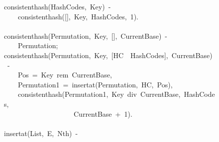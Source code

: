 \documentclass[runningheads,a4paper]{llncs}
\newcommand{\hlstd}[1]{\textcolor[rgb]{0,0,0}{#1}}
\newcommand{\hlnum}[1]{\textcolor[rgb]{0.69,0.49,0}{#1}}
\newcommand{\hlopt}[1]{\textcolor[rgb]{0,0,0}{#1}}
\newcommand{\hlkwd}[1]{\textcolor[rgb]{0,0,0.51}{#1}}
\begin{document}
\begin{figure}
\noindent
\ttfamily
\hlkwd{consistent\textunderscore hash}\hlstd{}\hlopt{(}\hlstd{HashCodes}\hlopt{,\ }\hlstd{Key}\hlopt{)\ {-}}\hspace*{\fill}\\
\hlstd{}\hlstd{\ \ \ \ }\hlstd{}\hlkwd{consistent\textunderscore hash}\hlstd{}\hlopt{({[}{]},\ }\hlstd{Key}\hlopt{,\ }\hlstd{HashCodes}\hlopt{,\ }\hlstd{}\hlnum{1}\hlstd{}\hlopt{).}\hspace*{\fill}\\
\hlstd{}\hspace*{\fill}\\
\hlkwd{consistent\textunderscore hash}\hlstd{}\hlopt{(}\hlstd{Permutation}\hlopt{,\ }\hlstd{\textunderscore Key}\hlopt{,\ {[}{]},\ }\hlstd{\textunderscore CurrentBase}\hlopt{)\ {-}}\hspace*{\fill}\\
\hlstd{}\hlstd{\ \ \ \ }\hlstd{Permutation}\hlopt{;}\hspace*{\fill}\\
\hlstd{}\hlkwd{consistent\textunderscore hash}\hlstd{}\hlopt{(}\hlstd{Permutation}\hlopt{,\ }\hlstd{Key}\hlopt{,\ {[}}\hlstd{HC\ \textbar \ HashCodes}\hlopt{{]},\ }\hlstd{CurrentBase}\hlopt{)\ {-}}\hspace*{\fill}\\
\hlstd{}\hlstd{\ \ \ \ }\hlstd{Pos\ }\hlopt{=\ }\hlstd{Key\ rem\ CurrentBase}\hlopt{,}\hspace*{\fill}\\
\hlstd{}\hlstd{\ \ \ \ }\hlstd{Permutation1\ }\hlopt{=\ }\hlstd{}\hlkwd{insert\textunderscore at}\hlstd{}\hlopt{(}\hlstd{Permutation}\hlopt{,\ }\hlstd{HC}\hlopt{,\ }\hlstd{Pos}\hlopt{),}\hspace*{\fill}\\
\hlstd{}\hlstd{\ \ \ \ }\hlstd{}\hlkwd{consistent\textunderscore hash}\hlstd{}\hlopt{(}\hlstd{Permutation1}\hlopt{,\ }\hlstd{Key\ div\ CurrentBase}\hlopt{,\ }\hlstd{HashCodes}\hlopt{,}\hspace*{\fill}\\
\hlstd{}\hlstd{\ \ \ \ \ \ \ \ \ \ \ \ \ \ \ \ \ \ \ \ }\hlstd{CurrentBase\ }\hlopt{+\ }\hlstd{}\hlnum{1}\hlstd{}\hlopt{).}\hspace*{\fill}\\
\hlstd{}\hspace*{\fill}\\
\hlkwd{insert\textunderscore at}\hlstd{}\hlopt{(}\hlstd{List}\hlopt{,\ }\hlstd{E}\hlopt{,\ }\hlstd{Nth}\hlopt{)\ {-}}\hspace*{\fill}\\

\end{figure}
\end{document}
